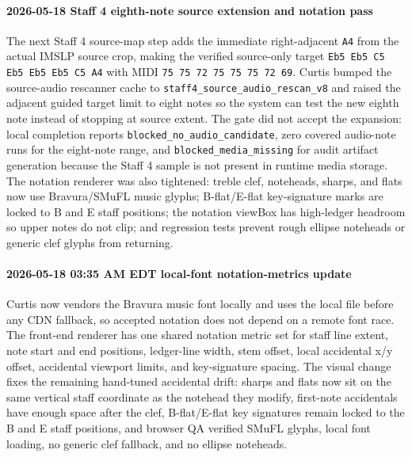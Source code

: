 \paragraph{2026-05-18 Staff 4 eighth-note source extension and notation pass} The next Staff 4 source-map step adds the immediate right-adjacent \texttt{A4} from the actual IMSLP source crop, making the verified source-only target \texttt{Eb5 Eb5 C5 Eb5 Eb5 Eb5 C5 A4} with MIDI \texttt{75 75 72 75 75 75 72 69}. Curtis bumped the source-audio rescanner cache to \texttt{staff4\_source\_audio\_rescan\_v8} and raised the adjacent guided target limit to eight notes so the system can test the new eighth note instead of stopping at source extent. The gate did not accept the expansion: local completion reports \texttt{blocked\_no\_audio\_candidate}, zero covered audio-note runs for the eight-note range, and \texttt{blocked\_media\_missing} for audit artifact generation because the Staff 4 sample is not present in runtime media storage. The notation renderer was also tightened: treble clef, noteheads, sharps, and flats now use Bravura/SMuFL music glyphs; B-flat/E-flat key-signature marks are locked to B and E staff positions; the notation viewBox has high-ledger headroom so upper notes do not clip; and regression tests prevent rough ellipse noteheads or generic clef glyphs from returning.

\paragraph{2026-05-18 03:35 AM EDT local-font notation-metrics update} Curtis now vendors the Bravura music font locally and uses the local file before any CDN fallback, so accepted notation does not depend on a remote font race. The front-end renderer has one shared notation metric set for staff line extent, note start and end positions, ledger-line width, stem offset, local accidental x/y offset, accidental viewport limits, and key-signature spacing. The visual change fixes the remaining hand-tuned accidental drift: sharps and flats now sit on the same vertical staff coordinate as the notehead they modify, first-note accidentals have enough space after the clef, B-flat/E-flat key signatures remain locked to the B and E staff positions, and browser QA verified SMuFL glyphs, local font loading, no generic clef fallback, and no ellipse noteheads.

